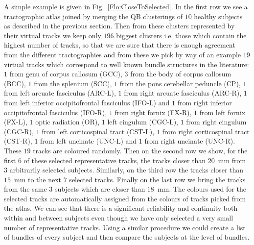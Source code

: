 \documentclass[preprint,authoryear,a4paper,10pt,onecolumn]{elsarticle}
\begin{document}
A simple example is given in Fig.~\ref{Flo:CloseToSelected}. In the
first row we see a tractographic atlas joined by merging the QB
clusterings of $10$ healthy subjects as described in the previous
section. Then from these clusters represented by their virtual tracks we
keep only $196$ biggest clusters i.e. those which contain the highest
number of tracks, so that we are sure that there is enough agreement
from the different tractographies and from these we pick by way of an
example $19$ virtual tracks which correspond to well known bundle
structures in the literature: 
$1$ from genu of corpus callosum (GCC),
$3$ from the body of corpus callosum (BCC), 
$1$ from the splenium (SCC),
$1$ from the pons cerebellar peduncle (CP), 
$1$ from left arcuate fasciculus (ARC-L), 
$1$ from right arcuate fasciculus (ARC-R), 
$1$ from left inferior occipitofrontal fasciculus (IFO-L) and 
$1$ from right inferior occipitofrontal fasciculus (IFO-R), 
$1$ from right fornix (FX-R), 
$1$ from left fornix (FX-L), 
$1$ optic radiation (OR), 
$1$ left cingulum (CGC-L), 
$1$ from right cingulum (CGC-R), 
$1$ from left corticospinal tract (CST-L), 
$1$ from right corticospinal tract (CST-R),
$1$ from left uncinate (UNC-L) and 
$1$ from right uncinate (UNC-R). 
These $19$ tracks are coloured randomly. Then on the second row
we show, for the first $6$ of these selected representative tracks, the
tracks closer than $20$~mm from $3$ arbitrarily selected
subjects. Similarly, on the third row the tracks closer than $15$~mm to
the next $7$ selected tracks. Finally on the last row we bring the
tracks from the same $3$ subjects which are closer than $18$~mm.  The
colours used for the selected tracks are automatically assigned from the
colours of tracks picked from the atlas. We can see that there is a
significant reliability and continuity both within and between subjects
even though we have only selected a very small number of representative
tracks. Using a similar procedure we could create a list of bundles of
every subject and then compare the subjects at the level of bundles.
\end{document}

